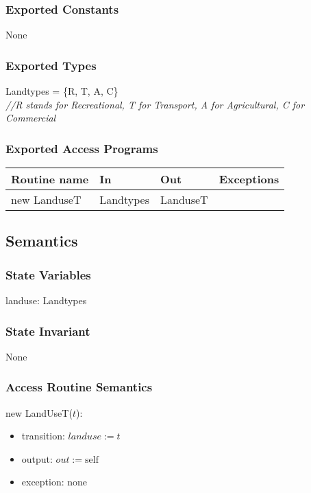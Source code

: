 \documentclass[12pt]{article}
\begin{document}
\subsubsection* {Exported Constants}

None

\subsubsection* {Exported Types}

Landtypes = \{R, T, A, C\}\\

\noindent \textit{//R stands for Recreational, T for Transport, A for Agricultural, C for
  Commercial}

\subsubsection* {Exported Access Programs}

\begin{tabular}{| l | l | l | p{5cm} |}
\hline
\textbf{Routine name} & \textbf{In} & \textbf{Out} & \textbf{Exceptions}\\
\hline
new LanduseT & Landtypes & LanduseT & ~\\
\hline
\end{tabular}

\subsection* {Semantics}

\subsubsection* {State Variables}

landuse: Landtypes

\subsubsection* {State Invariant}

None

\subsubsection* {Access Routine Semantics}

\noindent new LandUseT($t$):
\begin{itemize}
\item transition: $\mathit{landuse} := t$
\item output: $out := \mbox{self}$
\item exception: none
\end{itemize}
\end{document}
